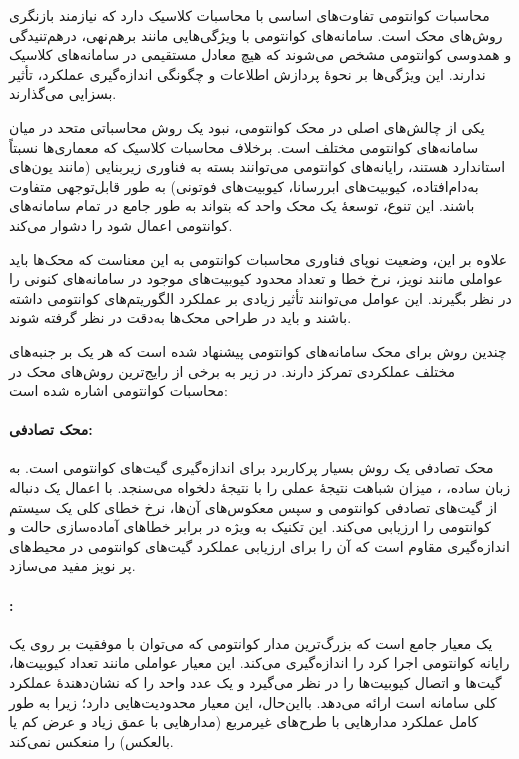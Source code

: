 محاسبات کوانتومی تفاوت‌های اساسی با محاسبات کلاسیک دارد که نیازمند بازنگری روش‌های محک است. سامانه‌های کوانتومی با ویژگی‌هایی مانند برهم‌نهی، درهم‌تنیدگی و همدوسی کوانتومی مشخص می‌شوند که هیچ معادل مستقیمی در سامانه‌های کلاسیک ندارند. این ویژگی‌ها بر نحوهٔ پردازش اطلاعات و چگونگی اندازه‌گیری عملکرد، تأثیر بسزایی می‌گذارند.

یکی از چالش‌های اصلی در محک کوانتومی، نبود یک روش محاسباتی متحد در میان سامانه‌های کوانتومی مختلف است. برخلاف محاسبات کلاسیک که معماری‌ها نسبتاً استاندارد هستند، رایانه‌های کوانتومی می‌توانند بسته به فناوری زیربنایی (مانند یون‌های به‌دام‌افتاده، کیوبیت‌های ابررسانا، کیوبیت‌های فوتونی) به طور قابل‌توجهی متفاوت باشند. این تنوع، توسعهٔ یک محک واحد که بتواند به طور جامع در تمام سامانه‌های کوانتومی اعمال شود را دشوار می‌کند.

علاوه بر این، وضعیت نوپای فناوری محاسبات کوانتومی به این معناست که محک‌ها باید عواملی مانند نویز، نرخ خطا و تعداد محدود کیوبیت‌های موجود در سامانه‌های کنونی را در نظر بگیرند. این عوامل می‌توانند تأثیر زیادی بر عملکرد الگوریتم‌های کوانتومی داشته باشند و باید در طراحی محک‌ها به‌دقت در نظر گرفته شوند.

چندین روش برای محک سامانه‌های کوانتومی پیشنهاد شده است که هر یک بر جنبه‌های مختلف عملکردی تمرکز دارند. در زیر به برخی از رایج‌ترین روش‌های محک در محاسبات کوانتومی اشاره شده است:
\paragraph{محک تصادفی:}
محک تصادفی یک روش بسیار پرکاربرد برای اندازه‌گیری 
گیت‌های کوانتومی است. به زبان ساده،
، میزان شباهت نتیجه‌ٔ عملی را با نتیجهٔ دلخواه می‌سنجد‌. با اعمال یک دنباله از گیت‌های تصادفی کوانتومی و سپس معکوس‌های آن‌ها، نرخ خطای کلی یک سیستم کوانتومی را ارزیابی می‌کند. این تکنیک به ویژه در برابر خطاهای آماده‌سازی حالت و اندازه‌گیری مقاوم است که آن را برای ارزیابی عملکرد گیت‌های کوانتومی در محیط‌های پر نویز مفید می‌سازد.

\paragraph{:}
یک معیار جامع است که بزرگ‌ترین مدار کوانتومی که می‌توان با موفقیت بر روی یک رایانه کوانتومی اجرا کرد را اندازه‌گیری می‌کند. این معیار عواملی مانند تعداد کیوبیت‌ها،  گیت‌ها و اتصال کیوبیت‌ها را در نظر می‌گیرد و یک عدد واحد را که نشان‌دهندهٔ عملکرد کلی سامانه است ارائه می‌دهد. بااین‌حال، این معیار محدودیت‌هایی دارد؛ زیرا به طور کامل عملکرد مدارهایی با طرح‌های غیرمربع (مدارهایی با عمق زیاد و عرض کم یا بالعکس) را منعکس نمی‌کند.

